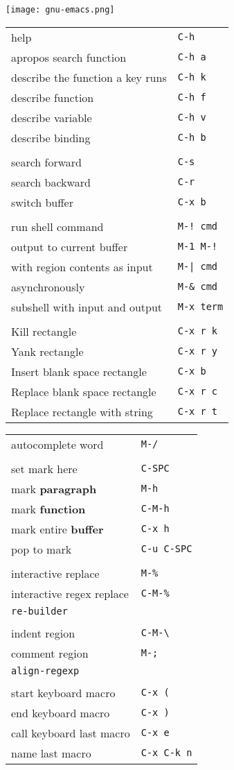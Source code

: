 \documentclass{minimal}
\begin{document}
\begin{multicols}{3}
\vspace*{\fill}
\begin{center}
\texttt{[image: gnu-emacs.png]}
\end{center}
\vspace*{\fill}
\columnbreak
\fontsize{6pt}{7pt}\selectfont

\fontsize{8pt}{9pt}\selectfont

\def\key#1#2{#1 & \texttt{#2} \\}


\begin{tabular}{ p{1.95in} p{.5in} }
\key{help}{C-h}
\key{apropos search function}{C-h a}
\key{describe the function a key runs}{C-h k}
\key{describe function}{C-h f}
\key{describe variable}{C-h v}
\key{describe binding}{C-h b}
&\\
\key{search forward}{C-s}
\key{search backward}{C-r}
\key{switch buffer}{C-x b}
&\\
\key{run shell command}{M-!~cmd}
\key{output to current buffer}{M-1 M-!}
\key{with region contents as input}{M-|~cmd}
\key{asynchronously}{M-\&~cmd}
\key{subshell with input and output}{M-x~term}
&\\
\key{Kill rectangle}{C-x r k}
\key{Yank rectangle}{C-x r y}
\key{Insert blank space rectangle}{C-x b}
\key{Replace blank space rectangle}{C-x r c}
\key{Replace rectangle with string}{C-x r t}
\end{tabular}
\begin{tabular}{ p{1.8in} p{.7in} }
\key{autocomplete word}{M-/}
&\\
\key{set mark here}{C-SPC}
\key{mark \textbf{paragraph}}{M-h}
\key{mark \textbf{function}}{C-M-h}
\key{mark entire \textbf{buffer}}{C-x h}
\key{pop to mark}{C-u C-SPC}
&\\
\key{interactive replace }{M-\%}
\key{interactive regex replace}{C-M-\%}
\key{\texttt{re-builder}}{}
&\\
\key{indent region}{C-M-\textbackslash}
\key{comment region}{M-;}
\key{\texttt{align-regexp}}{}
&\\
\key{start keyboard macro}{C-x (}
\key{end keyboard macro}{C-x )}
\key{call keyboard last macro}{C-x e}
\key{name last macro}{C-x C-k n}
\end{tabular}
\end{multicols}
\end{document}
